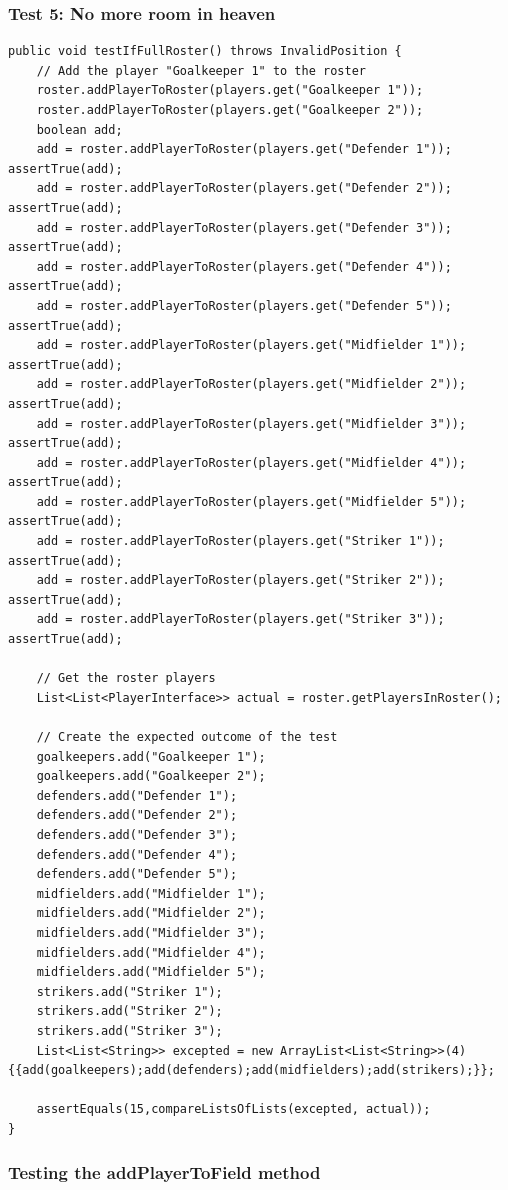 \documentclass{article}
\begin{document}
\subsubsection*{Test 5: No more room in heaven}
\begin{lstlisting}
public void testIfFullRoster() throws InvalidPosition {
	// Add the player "Goalkeeper 1" to the roster
	roster.addPlayerToRoster(players.get("Goalkeeper 1"));
	roster.addPlayerToRoster(players.get("Goalkeeper 2"));
	boolean add;
	add = roster.addPlayerToRoster(players.get("Defender 1"));	assertTrue(add);
	add = roster.addPlayerToRoster(players.get("Defender 2"));	assertTrue(add);
	add = roster.addPlayerToRoster(players.get("Defender 3"));	assertTrue(add);
	add = roster.addPlayerToRoster(players.get("Defender 4"));	assertTrue(add);
	add = roster.addPlayerToRoster(players.get("Defender 5"));	assertTrue(add);
	add = roster.addPlayerToRoster(players.get("Midfielder 1"));	assertTrue(add);
	add = roster.addPlayerToRoster(players.get("Midfielder 2"));	assertTrue(add);
	add = roster.addPlayerToRoster(players.get("Midfielder 3"));	assertTrue(add);
	add = roster.addPlayerToRoster(players.get("Midfielder 4"));	assertTrue(add);
	add = roster.addPlayerToRoster(players.get("Midfielder 5"));	assertTrue(add);
	add = roster.addPlayerToRoster(players.get("Striker 1"));		assertTrue(add);
	add = roster.addPlayerToRoster(players.get("Striker 2"));		assertTrue(add);
	add = roster.addPlayerToRoster(players.get("Striker 3"));		assertTrue(add);
	
	// Get the roster players
	List<List<PlayerInterface>> actual = roster.getPlayersInRoster();
	
	// Create the expected outcome of the test
	goalkeepers.add("Goalkeeper 1");
	goalkeepers.add("Goalkeeper 2");
	defenders.add("Defender 1");
	defenders.add("Defender 2");
	defenders.add("Defender 3");
	defenders.add("Defender 4");
	defenders.add("Defender 5");
	midfielders.add("Midfielder 1");
	midfielders.add("Midfielder 2");
	midfielders.add("Midfielder 3");
	midfielders.add("Midfielder 4");
	midfielders.add("Midfielder 5");
	strikers.add("Striker 1");
	strikers.add("Striker 2");
	strikers.add("Striker 3");
	List<List<String>> excepted = new ArrayList<List<String>>(4) {{add(goalkeepers);add(defenders);add(midfielders);add(strikers);}};
	
	assertEquals(15,compareListsOfLists(excepted, actual));
}
\end{lstlisting}
\subsubsection{Testing the addPlayerToField method}
\end{document}
